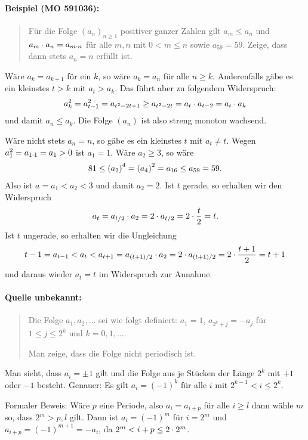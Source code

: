 \documentclass[11pt,a4paper]{article}
\begin{document}
\paragraph{Beispiel (MO 591036):}
\begin{quote}
  Für die Folge $(a_n)_{n\ge 1}$ positiver ganzer Zahlen gilt $a_m\le a_n$ und
  $a_m\cdot a_n=a_{m\cdot n}$ für alle $m,n$ mit $0<m\le n$ sowie $a_{59}=59$.
  Zeige, dass dann stets $a_n=n$ erfüllt ist.
\end{quote}
\begin{loesung}
  Wäre $a_k=a_{k+1}$ für ein $k$, so wäre $a_k=a_n$ für alle $n\ge k$.
  Anderenfalls gäbe es ein kleinstes $t>k$ mit $a_t>a_k$. Das führt aber zu
  folgendem Widerspruch:
  \begin{gather*}
    a_k^2=a_{t-1}^2=a_{t^2-2t+1}\ge a_{t^2-2t}=a_t\cdot a_{t-2}=a_t\cdot a_k
  \end{gather*}
  und damit $a_n\le a_k$.  Die Folge $(a_n)$ ist also streng monoton wachsend.

  Wäre nicht stets $a_n=n$, so gäbe es ein kleinstes $t$ mit $a_t\neq t$.
  Wegen $a_1^2=a_{1\cdot 1}=a_1>0$ ist $a_1=1$. Wäre $a_2\ge 3$, so wäre 
  \begin{gather*}
    81\le \left(a_2\right)^4=\left(a_4\right)^2=a_{16}\le a_{59}=59.
  \end{gather*}
  Also ist $a=a_1<a_2<3$ und damit $a_2=2$.  Ist $t$ gerade, so erhalten wir
  den Widerspruch
  \begin{gather*}
    a_t=a_{t/2}\cdot a_2=2\cdot a_{t/2}=2\cdot \frac{t}{2}=t.
  \end{gather*}
  Ist $t$ ungerade, so erhalten wir die Ungleichung
  \begin{gather*}
    t-1=a_{t-1}<a_t<a_{t+1}=a_{(t+1)/2}\cdot a_2=2\cdot a_{(t+1)/2}=2\cdot
    \frac{t+1}{2}=t+1
  \end{gather*}
  und daraus wieder $a_t=t$ im Widerspruch zur Annahme.   
\end{loesung}

\paragraph{Quelle unbekannt:}
\begin{quote}
  Die Folge $a_1,a_2,\dots$ sei wie folgt definiert: $a_1=1$, $a_{2^k+j}=-a_j$
  für $1\le j\le 2^k$ und $k=0,1,\dots$.

  Man zeige, dass die Folge nicht periodisch ist.
\end{quote}
\begin{loesung}
  Man sieht, dass $a_i=\pm 1$ gilt und die Folge aus je Stücken der Länge
  $2^k$ mit $+1$ oder $-1$ besteht.  Genauer: Es gilt $a_i=(-1)^k$ für alle
  $i$ mit $2^{k-1}<i\le 2^k$. 

  Formaler Beweis: Wäre $p$ eine Periode, also $a_i=a_{i+p}$ für alle $i\ge l$
  dann wähle $m$ so, dass $2^m> p,l$ gilt. Dann ist $a_i=(-1)^m$ für $i=2^m$
  und $a_{i+p}=(-1)^{m+1}=-a_i$, da $2^m<i+p\le 2\cdot 2^m$. 
\end{loesung}
\end{document}
